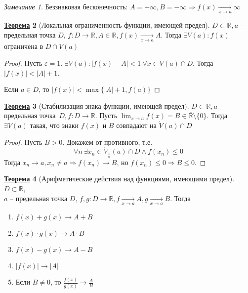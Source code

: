 \documentclass[12pt]{article}
\newenvironment{MyList}[1][4pt]{
  \begin{enumerate}[1.]
  \setlength{\parskip}{0pt}
  \setlength{\itemsep}{#1}
}{       
  \end{enumerate}
}
\def\R{\mathbb{R}}       %
\def\SO{\Rightarrow}     %
\theoremstyle{definition} %
\newtheorem{Thm}{\underline{Теорема}}[subsection] %
\theoremstyle{plain} %
\theoremstyle{remark} %
\newtheorem{Rem}[Thm]{Замечание} %
\begin{document}
\begin{Rem}
    Беззнаковая бесконечность: $A = +\infty, B = -\infty \SO f(x) \xrightarrow[x \to a]{} \infty$ 
\end{Rem}

\begin{Thm}[Локальная ограниченность функции, имеющей предел]
    $D \subset \R, a$ -- предельная точка $D$, $f: D \to \R, A \in \R, f(x) \xrightarrow[x \to a]{} A$. Тогда $\exists V(a) : f(x)$ ограничена в $D \cap V(a)$  
\end{Thm}

\begin{proof}
    Пусть $\varepsilon = 1$. $\exists \dot{V}(a) : |f(x) - A| < 1 \ \forall x \in \dot{V}(a) \cap D$. Тогда $|f(x)| < |A| + 1$.

    Если $a \in D$, то $|f(x)| < \max \{|A| + 1, f(a)\}$  
\end{proof}

\begin{Thm}[Стабилизация знака функции, имеющей предел]
    $D \subset \R, a$ -- предельная точка~$D, f: D \to \R$. Пусть $\lim_{x \to a} f(x) = B \in \overline{\R} \setminus \{0\}$.
    Тогда $\exists V(a)$ такая, что знаки $f(x)$ и $B$ совпадают на $\dot{V}(a) \cap D$     
\end{Thm}

\begin{proof}
    Пусть $B > 0$. Докажем от противного, т.е.
    \[\forall n \ \exists x_n \in \dot{V}_{\frac{1}{n}} (a) \cap D \wedge f(x_n) \leqslant 0\]
    Тогда $x_n \to a, x_n \neq a \SO f(x_n) \to B$, но $f(x_n) \leqslant 0 \SO B \leqslant 0$.  
\end{proof}

\begin{Thm}[Арифметические действия над функциями, имеющими предел]
    $D \subset \R$, \\ $a$ -- предельная точка $D$, $f, g : D \to \R, f \xrightarrow[x \to a]{} A, g \xrightarrow[x \to a]{} B$. Тогда 
    \begin{MyList}
        \item $f(x) + g(x) \to A + B$ 
        \item $f(x) \cdot g(x) \to A \cdot B$ 
        \item $f(x) - g(x) \to A - B$ 
        \item $|f(x)| \to |A|$ 
        \item Если $B \neq 0$, то $ \frac{f(x)}{g(x)} \to \frac{A}{B}$ 
    \end{MyList}
\end{Thm}
\end{document}
